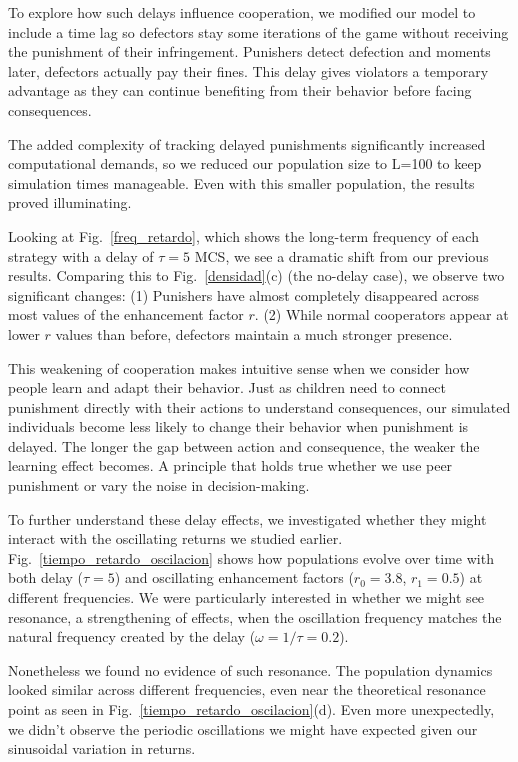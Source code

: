 To explore how such delays influence cooperation, we modified our model to include a time lag so defectors stay some iterations of the game without receiving the punishment of their infringement.  Punishers detect defection and moments later, defectors actually pay their fines. This delay gives violators a temporary advantage as they can continue benefiting from their behavior before facing consequences.

The added complexity of tracking delayed punishments significantly increased computational demands, so we reduced our population size to L=100 to keep simulation times manageable. Even with this smaller population, the results proved illuminating.

Looking at Fig.~\ref{freq_retardo}, which shows the long-term frequency of each strategy with a delay of $\tau=5$ MCS, we see a dramatic shift from our previous results. Comparing this to Fig.~\ref{densidad}(c) (the no-delay case), we observe two significant changes: (1) Punishers have almost completely disappeared across most values of the enhancement factor $r$. (2) While normal cooperators appear at lower $r$ values than before, defectors maintain a much stronger presence.

This weakening of cooperation makes intuitive sense when we consider how people learn and adapt their behavior. Just as children need to connect punishment directly with their actions to understand consequences, our simulated individuals become less likely to change their behavior when punishment is delayed. The longer the gap between action and consequence, the weaker the learning effect becomes. A principle that holds true whether we use peer punishment or vary the noise in decision-making.

To further understand these delay effects, we investigated whether they might interact with the oscillating returns we studied earlier. Fig.~\ref{tiempo_retardo_oscilacion} shows how populations evolve over time with both delay ($\tau=5$) and oscillating enhancement factors ($r_0=3.8$, $r_1=0.5$) at different frequencies. We were particularly interested in whether we might see resonance, a strengthening of effects, when the oscillation frequency matches the natural frequency created by the delay ($\omega=1/\tau=0.2$).

Nonetheless we found no evidence of such resonance. The population dynamics looked similar across different frequencies, even near the theoretical resonance point as seen in Fig.~\ref{tiempo_retardo_oscilacion}(d). Even more unexpectedly, we didn't observe the periodic oscillations we might have expected given our sinusoidal variation in returns.

